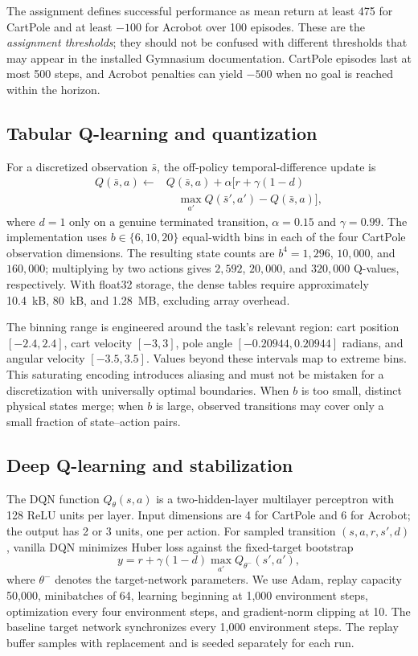 \documentclass[conference,10pt]{IEEEtran}
\begin{document}
The assignment defines successful performance as mean return at least 475 for CartPole and at least $-100$ for Acrobot over 100 episodes. These are the \emph{assignment thresholds}; they should not be confused with different thresholds that may appear in the installed Gymnasium documentation. CartPole episodes last at most 500 steps, and Acrobot penalties can yield $-500$ when no goal is reached within the horizon.

\subsection{Tabular Q-learning and quantization}
For a discretized observation $\bar{s}$, the off-policy temporal-difference update is
\begin{equation}
\begin{aligned}
Q(\bar s,a)\leftarrow{}&Q(\bar s,a)+\alpha\bigl[r+\gamma(1-d)\\
&\quad\max_{a'}Q(\bar s',a')-Q(\bar s,a)\bigr],
\end{aligned}\label{eq:tabular}
\end{equation}
where $d=1$ only on a genuine terminated transition, $\alpha=0.15$ and $\gamma=0.99$. The implementation uses $b\in\{6,10,20\}$ equal-width bins in each of the four CartPole observation dimensions. The resulting state counts are $b^4=1,296$, $10,000$, and $160,000$; multiplying by two actions gives $2,592$, $20,000$, and $320,000$ Q-values, respectively. With float32 storage, the dense tables require approximately 10.4~kB, 80~kB, and 1.28~MB, excluding array overhead.

The binning range is engineered around the task's relevant region: cart position $[-2.4,2.4]$, cart velocity $[-3,3]$, pole angle $[-0.20944,0.20944]$ radians, and angular velocity $[-3.5,3.5]$. Values beyond these intervals map to extreme bins. This saturating encoding introduces aliasing and must not be mistaken for a discretization with universally optimal boundaries. When $b$ is too small, distinct physical states merge; when $b$ is large, observed transitions may cover only a small fraction of state--action pairs.

\subsection{Deep Q-learning and stabilization}
The DQN function $Q_\theta(s,a)$ is a two-hidden-layer multilayer perceptron with 128 ReLU units per layer. Input dimensions are 4 for CartPole and 6 for Acrobot; the output has 2 or 3 units, one per action. For sampled transition $(s,a,r,s',d)$, vanilla DQN minimizes Huber loss against the fixed-target bootstrap
\begin{equation}
\label{eq:dqn}
y=r+\gamma(1-d)\max_{a'}Q_{\theta^-}(s',a'),
\end{equation}
where $\theta^-$ denotes the target-network parameters. We use Adam, replay capacity 50,000, minibatches of 64, learning beginning at 1,000 environment steps, optimization every four environment steps, and gradient-norm clipping at 10. The baseline target network synchronizes every 1,000 environment steps. The replay buffer samples with replacement and is seeded separately for each run.
\end{document}
